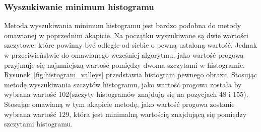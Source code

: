 \subsubsection{Wyszukiwanie minimum histogramu}
Metoda wyszukiwania minimum histogramu jest bardzo podobna do metody omawianej w poprzednim akapicie. Na początku wyszukiwane są dwie wartości szczytowe, które powinny być odległe od siebie o pewną ustaloną wartość. Jednak w przeciwieństwie do omawianego wcześniej algorytmu, jako wartość progową przyjmuje się najmniejszą wartość pomiędzy dwoma szczytami w histogramie. \\
Rysunek~\ref{fig:histogram_valleys} przedstawia histogram pewnego obrazu. Stosując metodę wyszukiwania szczytów histogramu, jako wartość progowa została by wybrana wartość 102(szczyty histogramów znajdują się na pozycjach 48 i 155). Stosując omawianą w tym akapicie metodę, jako wartość progowa zostanie wybrana wartość 129, która jest minimalną wartością znajdującą się pomiędzy szczytami histogramu.

